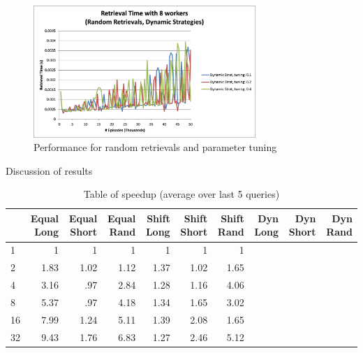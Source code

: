 \documentclass[11pt]{article} %
\begin{document}
\begin{figure}[h]
\caption{Performance for random retrievals and parameter tuning}
\centering
\includegraphics[width=0.75\textwidth]{images/alldynamicrand}
\end{figure}

Discussion of results

\begin{table}[h]
\caption{Table of speedup (average over last 5 queries)}
\centering
    \begin{tabular}{|l|r|r|r|r|r|r|r|r|r|}
        \hline
        ~  & Equal Long & Equal Short & Equal Rand & Shift Long & Shift Short & Shift Rand & Dyn Long & Dyn Short & Dyn Rand \\ \hline
        1  & 1          & 1                  & 1               & 1            & 1        & 1      & ~          & ~         & ~        \\  \hline
        2  & 1.83          & 1.02           & 1.12           & 1.37         & 1.02       & 1.65         & ~        & ~         & ~        \\ \hline
        4  & 3.16          & .97          & 2.84           & 1.28         & 1.16        & 4.06        & ~        & ~         & ~        \\ \hline
        8  & 5.37          & .97          & 4.18         & 1.34         & 1.65        & 3.02        & ~        & ~         & ~        \\ \hline
        16 & 7.99          & 1.24           & 5.11          & 1.39         & 2.08       & 1.65         & ~        & ~         & ~        \\ \hline
        32 & 9.43          & 1.76          & 6.83          & 1.27         & 2.46       & 5.12        & ~        & ~         & ~        \\
        \hline
    \end{tabular}
\end{table}
\end{document}
